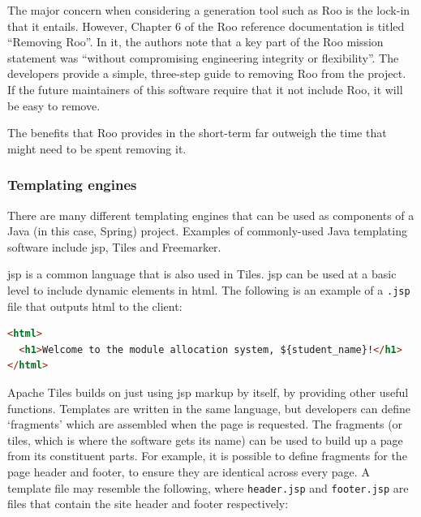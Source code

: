 \documentclass[draft]{scrartcl}
\begin{document}
The major concern when considering a generation tool such as Roo is the
lock-in that it entails. However, Chapter 6 of the Roo reference documentation
\cite{RooReferenceDocs2011} is titled ``Removing Roo''. In it, the authors
note that a key part of the Roo mission statement was ``without compromising
engineering integrity or flexibility''. The developers provide a simple,
three-step guide to removing Roo from the project. If the future maintainers
of this software require that it not include Roo, it will be easy to remove.

The benefits that Roo provides in the short-term far outweigh the time that
might need to be spent removing it.

\subsubsection{Templating engines}


There are many different templating engines that can be used as components of
a Java (in this case, Spring) project. Examples of commonly-used Java
templating software include \gls{jsp}, Tiles and Freemarker.


\gls{jsp} is a common language that is also used in Tiles. \gls{jsp} can be
used at a basic level to include dynamic elements in \gls{html}. The following
is an example of a \texttt{.jsp} file that outputs \gls{html} to the client:

\begin{lstlisting}[language=HTML]
<html>
  <h1>Welcome to the module allocation system, ${student_name}!</h1>
</html>
\end{lstlisting}


Apache Tiles builds on just using \gls{jsp} markup by itself, by providing
other useful functions. Templates are written in the same language, but
developers can define `fragments' which are assembled when the page is
requested. The fragments (or tiles, which is where the software gets its name)
can be used to build up a page from its constituent parts. For example, it is
possible to define fragments for the page header and footer, to ensure they
are identical across every page. A template file may resemble the following,
where \texttt{header.jsp} and \texttt{footer.jsp} are files that contain the
site header and footer respectively:
\end{document}
